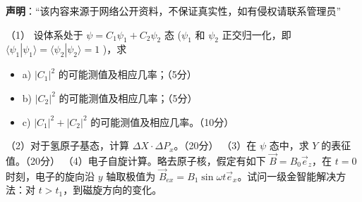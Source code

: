 
\textbf{声明}：“该内容来源于网络公开资料，不保证真实性，如有侵权请联系管理员”

（1）
     设体系处于 $\psi = C_1 \psi_1 + C_2 \psi_2$ 态 ($\psi_1$ 和 $\psi_2$ 正交归一化，即 $\langle \psi_1 | \psi_1 \rangle = \langle \psi_2 | \psi_2 \rangle = 1$ )，求
     
    \begin{itemize}
        \item a) $|C_1|^2$ 的可能测值及相应几率；（5分）
        \item b) $|C_2|^2$ 的可能测值及相应几率；（5分）
        \item c) $|C_1|^2 + |C_2|^2$ 的可能测值及相应几率。（10分）
   \end{itemize}

（2）对于氢原子基态，计算 $\Delta X \cdot \Delta P_x$。（20分）
（3）在 $\psi$ 态中，求 $Y$ 的表征值。（20分）
（4）电子自旋计算。略去原子核，假定有如下 $\vec{B} = B_0 \vec{e}_z$，在 $t=0$ 时刻，电子的旋向沿 $y$ 轴取极值为 $\vec{B}_{ex} = B_1 \sin \omega t \vec{e}_x$。试问一级金智能解决方法：对 $t>t_1$，到磁旋方向的变化。
